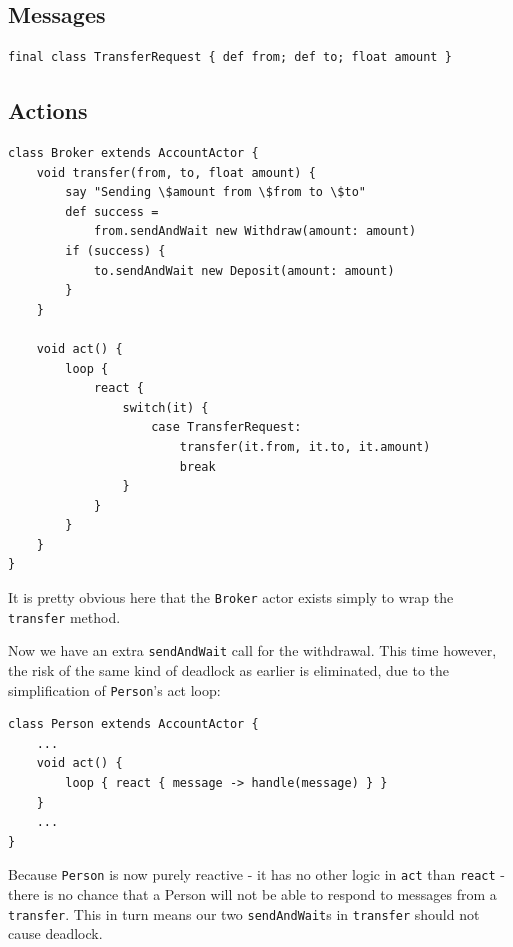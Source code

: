 \documentclass[a4paper,12pt]{kth-mag}
\begin{document}
\subsection{Messages}

\begin{listing}[H]
	\begin{verbatim}
final class TransferRequest { def from; def to; float amount }
	\end{verbatim}
\end{listing}

\subsection{Actions}

\begin{listing}[H]
	\begin{verbatim}
class Broker extends AccountActor {
    void transfer(from, to, float amount) {
        say "Sending \$amount from \$from to \$to"
        def success = 
            from.sendAndWait new Withdraw(amount: amount)
        if (success) { 
            to.sendAndWait new Deposit(amount: amount) 
        } 
    }

    void act() {
        loop {
            react { 
                switch(it) {
                    case TransferRequest:
                        transfer(it.from, it.to, it.amount)
                        break
                }
            }
        }
    }
}
	\end{verbatim}
\end{listing}

It is pretty obvious here that the \texttt{Broker} actor exists simply to wrap the \texttt{transfer} method. 

Now we have an extra \texttt{sendAndWait} call for the withdrawal. This time however, the risk of the same kind of deadlock as earlier is eliminated, due to the simplification of \texttt{Person}'s act loop:

\begin{listing}[H]
	\begin{verbatim}
class Person extends AccountActor {
    ...
    void act() {
        loop { react { message -> handle(message) } }
    }
    ...
}
	\end{verbatim}
\end{listing}

Because \texttt{Person} is now purely reactive - it has no other logic in \texttt{act} than \texttt{react} - there is no chance that a Person will not be able to respond to messages from a \texttt{transfer}. This in turn means our two \texttt{sendAndWait}s in \texttt{transfer} should not cause deadlock.
\end{document}
